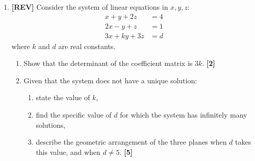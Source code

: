 \documentclass[11pt,a4paper]{article}
\begin{document}
\begin{enumerate}[resume]
\item \textbf{[REV]} Consider the system of linear equations in $x, y, z$:
\[
\begin{aligned}
x + y + 2z &= 4 \\
2x - y + z &= 1 \\
3x + ky + 3z &= d
\end{aligned}
\]
where $k$ and $d$ are real constants.
\begin{enumerate}
  \item Show that the determinant of the coefficient matrix is $3k$. \hfill{\small\textbf{[2]}}
  \item Given that the system does not have a unique solution:
  \begin{enumerate}[label=(\roman*)]
    \item state the value of $k$,
    \item find the specific value of $d$ for which the system has infinitely many solutions,
    \item describe the geometric arrangement of the three planes when $d$ takes this value, and when $d \neq 5$. \hfill{\small\textbf{[5]}}
  \end{enumerate}
\end{enumerate}

\end{enumerate}

\newpage
\end{document}
